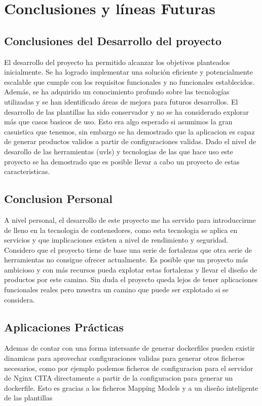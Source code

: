\documentclass[12pt, a4paper, twoside]{article}
\begin{document}
\section{Conclusiones y líneas Futuras }
\label{sec:Conclusiones}


\subsection{Conclusiones del Desarrollo del proyecto}
El desarrollo del proyecto ha permitido alcanzar los objetivos planteados inicialmente. Se ha logrado implementar una solución eficiente y potencialmente escalable que cumple con los requisitos funcionales y no funcionales establecidos. Además, se ha adquirido un conocimiento profundo sobre las tecnologías utilizadas y se han identificado áreas de mejora para futuros desarrollos.
El desarrollo de las plantillas ha sido conservador y no se ha considerado explorar más que casos basicos de uso. Esto era algo esperado si asumimos la gran casuistica que tenemos, sin embargo se ha demostrado que la aplicacion es capaz de generar productos validos a partir de configuraciones validas. Dado el nivel de desarollo de las herramientas (uvls) y tecnologias de las que hace uso este proyecto se ha demostrado que es posible llevar a cabo un proyecto de estas caracteristicas.
\subsection{Conclusion Personal}
A nivel personal, el desarrollo de este proyecto me ha servido para introduccirme de lleno en la tecnologia de contenedores, como esta tecnologia se aplica en servicios y que implicaciones existen a nivel de rendimiento y seguridad. Considero que el proyecto tiene de base una serie de fortalezas que otra serie de herramientas no consigue ofrecer actualmente. Es posible que un proyecto más ambicioso y con más recursos pueda explotar estas fortalezas y llevar el diseño de productos por este camino.
Sin duda el proyecto queda lejos de tener aplicaciones funcionales reales pero muestra un camino que puede ser explotado si se considera. 
\subsection{Aplicaciones Prácticas}
Ademas de contar con una forma intersante de generar dockerfiles pueden existir dinamicas para aprovechar configuraciones validas para generar otros ficheros necesarios, como por ejemplo podemos ficheros de configuracion para el servidor de Nginx CITA directamente a partir de la configuracion para generar un dockerfile. Esto es gracias a los ficheros Mapping Models y a un diseño inteligente de las plantillas
\end{document}

